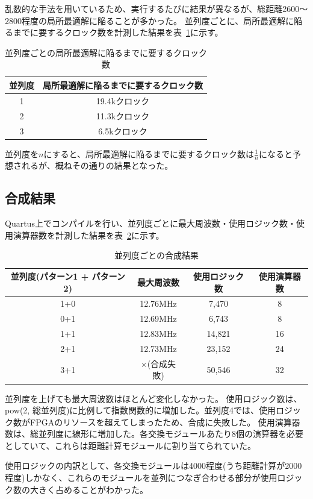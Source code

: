 乱数的な手法を用いているため、実行するたびに結果が異なるが、総距離2600～2800程度の局所最適解に陥ることが多かった。
並列度ごとに、局所最適解に陥るまでに要するクロック数を計測した結果を表~\ref{tab:time}に示す。
\begin{table}[h]
    \begin{center}
        \caption{並列度ごとの局所最適解に陥るまでに要するクロック数}\label{tab:time}
        \begin{tabular}{|c|c|}
            \hline
            並列度 & 局所最適解に陥るまでに要するクロック数 \\ \hline
            1      & 19.4kクロック                     \\ \hline
            2      & 11.3kクロック                       \\ \hline
            3      & 6.5kクロック                       \\ \hline
        \end{tabular}
    \end{center}
\end{table}
並列度を$n$にすると、局所最適解に陥るまでに要するクロック数は$\frac{1}{n}$になると予想されるが、概ねその通りの結果となった。
\subsection{合成結果}\label{sec:compile}
Quartus上でコンパイルを行い、並列度ごとに最大周波数・使用ロジック数・使用演算器数を計測した結果を表~\ref{tab:compile}に示す。
\begin{table}[h]
    \begin{center}
        \caption{並列度ごとの合成結果}\label{tab:compile}
        \begin{tabular}{|c|c|c|c|}
            \hline
            並列度(パターン1 + パターン2) & 最大周波数 & 使用ロジック数 & 使用演算器数 \\ \hline
            1+0      & 12.76MHz    &  7,470          & 8       \\ \hline
            0+1      & 12.69MHz    &  6,743          & 8       \\ \hline
            1+1      & 12.83MHz    & 14,821          & 16       \\ \hline
            2+1      & 12.73MHz    & 23,152          & 24       \\ \hline
            3+1      & ×(合成失敗)        & 50,546          & 32       \\ \hline
        \end{tabular}
    \end{center}
\end{table}

並列度を上げても最大周波数はほとんど変化しなかった。
使用ロジック数は、pow(2, 総並列度)に比例して指数関数的に増加した。並列度4では、使用ロジック数がFPGAのリソースを超えてしまったため、合成に失敗した。
使用演算器数は、総並列度に線形に増加した。各交換モジュールあたり8個の演算器を必要としていて、これらは距離計算モジュールに割り当てられていた。

使用ロジックの内訳として、各交換モジュールは4000程度(うち距離計算が2000程度)しかなく、これらのモジュールを並列につなぎ合わせる部分が使用ロジック数の大きく占めることがわかった。